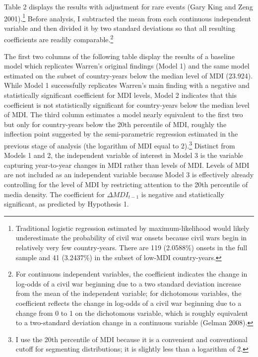 \documentclass[12pt,article,oneside]{memoir}
\begin{document}
Table 2 displays the results with adjustment for rare events (Gary King
and Zeng 2001).\footnote{Traditional logistic regression estimated by
  maximum-likelihood would likely underestimate the probability of civil
  war onsets because civil wars begin in relatively very few
  country-years. There are 119 (2.0588\%) onsets in the full sample and
  41 (3.2437\%) in the subset of low-MDI country-years.} Before
analysis, I subtracted the mean from each continuous independent
variable and then divided it by two standard deviations so that all
resulting coefficients are readily comparable.\footnote{For continuous
  independent variables, the coefficient indicates the change in
  log-odds of a civil war beginning due to a two standard deviation
  increase from the mean of the independent variable; for dichotomous
  variables, the coefficient reflects the change in log-odds of a civil
  war beginning due to a change from 0 to 1 on the dichotomous variable,
  which is roughly equivalent to a two-standard deviation change in a
  continuous variable (Gelman 2008).}

The first two columns of the following table display the results of a
baseline model which replicates Warren's original findings (Model 1) and
the same model estimated on the subset of country-years below the median
level of MDI (23.924). While Model 1 successfully replicates Warren's
main finding with a negative and statistically significant coefficient
for MDI levels, Model 2 indicates that this coefficient is not
statistically significant for country-years below the median level of
MDI. The third column estimates a model nearly equivalent to the first
two but only for country-years below the 20th percentile of MDI, roughly
the inflection point suggested by the semi-parametric regression
estimated in the previous stage of analysis (the logarithm of MDI equal
to 2).\footnote{I use the 20th percentile of MDI because it is a
  convenient and conventional cutoff for segmenting distributions; it is
  slightly less than a logarithm of 2.} Distinct from Models 1 and 2,
the independent variable of interest in Model 3 is the variable
capturing year-to-year changes in MDI rather than levels of MDI. Levels
of MDI are not included as an independent variable because Model 3 is
effectively already controlling for the level of MDI by restricting
attention to the 20th percentile of media density. The coefficient for
$\Delta$$MDI_{t-1}$ is negative and statistically significant, as
predicted by Hypothesis 1.
\end{document}
